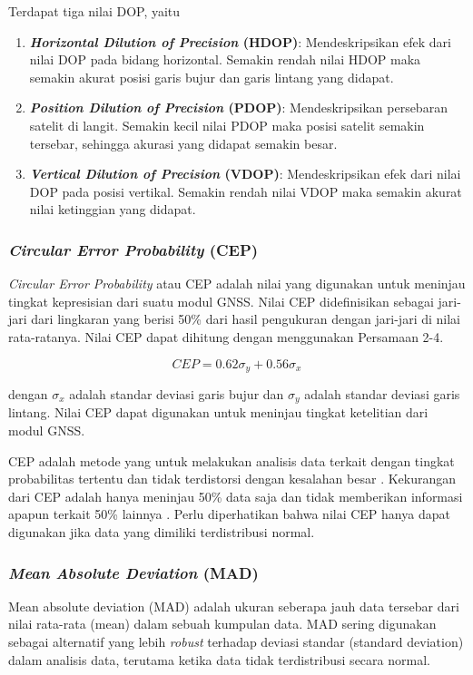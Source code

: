 Terdapat tiga nilai DOP, yaitu
\begin{enumerate}
	\item \textbf{\textit{Horizontal Dilution of Precision} (HDOP)}: Mendeskripsikan efek dari nilai DOP pada bidang horizontal. Semakin rendah nilai HDOP maka semakin akurat posisi garis bujur dan garis lintang yang didapat.
	\item \textbf{\textit{Position Dilution of Precision} (PDOP)}: Mendeskripsikan persebaran satelit di langit. Semakin kecil nilai PDOP maka posisi satelit semakin tersebar, sehingga akurasi yang didapat semakin besar.
	\item \textbf{\textit{Vertical Dilution of Precision} (VDOP)}: Mendeskripsikan efek dari nilai DOP pada posisi vertikal. Semakin rendah nilai VDOP maka semakin akurat nilai ketinggian yang didapat.
\end{enumerate}

\subsubsection{\textit{Circular Error Probability} (CEP)}
\textit{Circular Error Probability} atau CEP adalah nilai yang digunakan untuk meninjau tingkat kepresisian dari suatu modul GNSS. Nilai CEP didefinisikan sebagai jari-jari dari lingkaran yang berisi 50\% dari hasil pengukuran dengan jari-jari di nilai rata-ratanya. Nilai CEP dapat dihitung dengan menggunakan Persamaan 2-4.

\begin{equation}
CEP = 0.62 \sigma_y + 0.56 \sigma_x
\label{eq:2-4}
\end{equation}

dengan $\sigma_x$ adalah standar deviasi garis bujur dan $\sigma_y$ adalah standar deviasi garis lintang. Nilai CEP dapat digunakan untuk meninjau tingkat ketelitian dari modul GNSS.

CEP adalah metode yang untuk melakukan analisis data terkait dengan tingkat probabilitas tertentu dan tidak terdistorsi dengan kesalahan besar \cite{Chin1983}. Kekurangan dari CEP adalah hanya meninjau 50\% data saja dan tidak memberikan informasi apapun terkait 50\% lainnya \cite{Sathish2016}. Perlu diperhatikan bahwa nilai CEP hanya dapat digunakan jika data yang dimiliki terdistribusi normal.

\subsubsection{\textit{Mean Absolute Deviation} (MAD)}
Mean absolute deviation (MAD) adalah ukuran seberapa jauh data tersebar dari nilai rata-rata (mean) dalam sebuah kumpulan data. MAD sering digunakan sebagai alternatif yang lebih \textit{robust} terhadap deviasi standar (standard deviation) dalam analisis data, terutama ketika data tidak terdistribusi secara normal.

